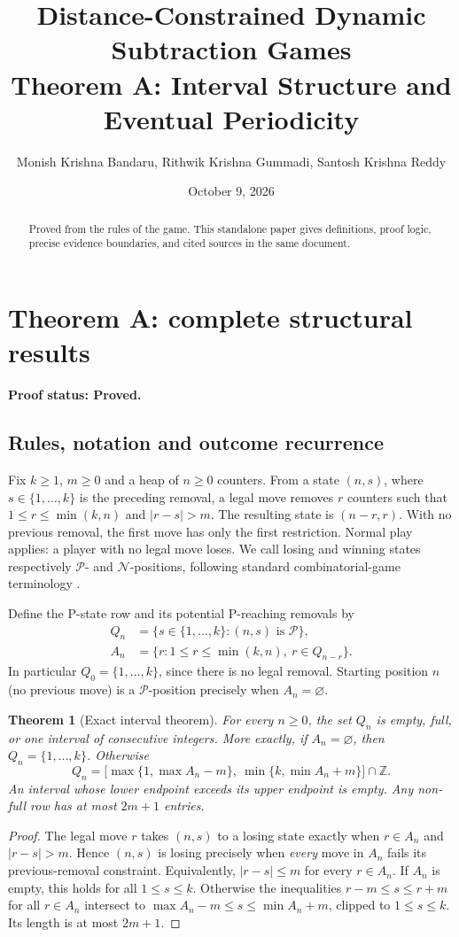 \documentclass[11pt]{article}
\title{\textbf{Distance-Constrained Dynamic Subtraction Games}\\[0.4em]Theorem A: Interval Structure and Eventual Periodicity}
\author{Monish Krishna Bandaru, Rithwik Krishna Gummadi, Santosh Krishna Reddy}
\date{October 9, 2026}
\newtheorem{theorem}{Theorem}[section]
\newcommand{\Pset}{\mathcal{P}}
\newcommand{\Nset}{\mathcal{N}}
\newcommand{\statusproved}{\textbf{Proof status: Proved.}}
\begin{document}
\maketitle
\begin{abstract}Proved from the rules of the game. This standalone paper gives definitions, proof logic, precise evidence boundaries, and cited sources in the same document.\end{abstract}
\tableofcontents
\section{Theorem A: complete structural results}\label{sec:A}
\statusproved
\subsection{Rules, notation and outcome recurrence}
Fix $k\ge1$, $m\ge0$ and a heap of $n\ge0$ counters. From a state $(n,s)$, where $s\in\{1,\ldots,k\}$ is the preceding removal, a legal move removes $r$ counters such that $1\le r\le\min(k,n)$ and $|r-s|>m$. The resulting state is $(n-r,r)$. With no previous removal, the first move has only the first restriction. Normal play applies: a player with no legal move loses. We call losing and winning states respectively $\Pset$- and $\Nset$-positions, following standard combinatorial-game terminology \cite{sprague1935,grundy1939,winningways2001}.

Define the P-state row and its potential P-reaching removals by
\begin{align}
Q_n&=\{s\in\{1,\ldots,k\}:(n,s)\text{ is }\Pset\},\\
A_n&=\{r:1\le r\le\min(k,n),\ r\in Q_{n-r}\}.
\end{align}
In particular $Q_0=\{1,\ldots,k\}$, since there is no legal removal. Starting position $n$ (no previous move) is a $\Pset$-position precisely when $A_n=\varnothing$.

\begin{theorem}[Exact interval theorem]\label{thm:Ainterval}
For every $n\ge0$, the set $Q_n$ is empty, full, or one interval of consecutive integers. More exactly, if $A_n=\varnothing$, then $Q_n=\{1,\ldots,k\}$. Otherwise
\[
\boxed{Q_n=\bigl[\max\{1,\max A_n-m\},\ \min\{k,\min A_n+m\}\bigr]\cap\mathbb Z.}
\]
An interval whose lower endpoint exceeds its upper endpoint is empty. Any non-full row has at most $2m+1$ entries.
\end{theorem}
\begin{proof}
The legal move $r$ takes $(n,s)$ to a losing state exactly when $r\in A_n$ and $|r-s|>m$. Hence $(n,s)$ is losing precisely when \emph{every} move in $A_n$ fails its previous-removal constraint. Equivalently, $|r-s|\le m$ for every $r\in A_n$. If $A_n$ is empty, this holds for all $1\le s\le k$. Otherwise the inequalities $r-m\le s\le r+m$ for all $r\in A_n$ intersect to $\max A_n-m\le s\le\min A_n+m$, clipped to $1\le s\le k$. Its length is at most $2m+1$.
\end{proof}
\end{document}
